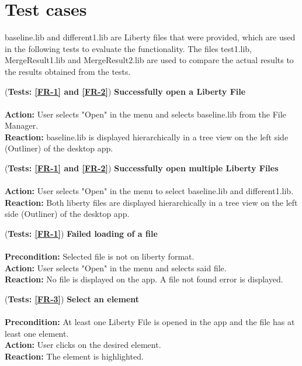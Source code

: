 \documentclass[10pt,a4paper]{report}
\newcommand{\precondition}[1]{
    \textbf{Precondition: } #1 \leavevmode \\
}
\newcommand{\action}[1]{
    \textbf{Action: } #1 \leavevmode \\
}
\newcommand{\reaction}[1]{
    \textbf{Reaction: } #1 \leavevmode \\
}
\newcommand{\GTCDescription}[2]{
    (\textbf{Tests: #1}) \textbf{#2} \leavevmode \\
}
\begin{document}
\section{Test cases}

  baseline.lib and different1.lib are Liberty files that were provided, which are used in the following tests to evaluate the functionality. The files test1.lib, MergeResult1.lib and MergeResult2.lib are used to compare the actual results to the results obtained from the tests.
  
\begin{GTC}
    \item \GTCDescription{\ref{FR-1} and \ref{FR-2}}{Successfully open a Liberty File} \leavevmode \\ \action{User selects "Open" in the menu and selects baseline.lib from the File Manager.}\reaction{baseline.lib is displayed hierarchically in a tree view on the left side (Outliner) of the desktop app.
}
    \item \GTCDescription{\ref{FR-1} and \ref{FR-2}}{Successfully open multiple Liberty Files} \leavevmode \\ \action{User selects "Open" in the menu to select baseline.lib and different1.lib.}\reaction{Both liberty files are displayed hierarchically in a tree view on the left side (Outliner) of the desktop app.
}
    \item \GTCDescription{\ref{FR-1}}{Failed loading of a file} \leavevmode \\ \precondition{Selected file is not on liberty format.}\action{User selects "Open" in the menu and selects said file.}\reaction{No file is displayed on the app. A file not found error is displayed.
}
    \item \GTCDescription{\ref{FR-3}}{Select an element} \leavevmode \\ \precondition{At least one Liberty File is opened in the app and the file has at least one element.}\action{User clicks on the desired element.}\reaction{The element is highlighted.
}


\end{GTC}
\end{document}
